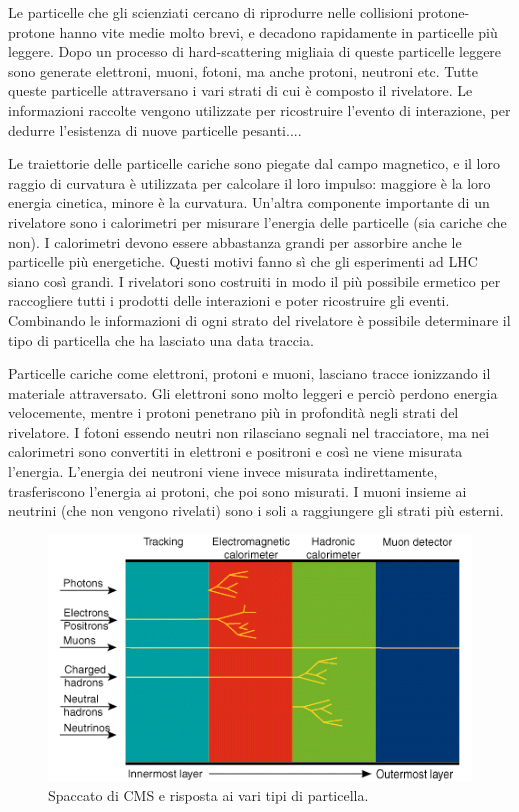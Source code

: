 Le particelle che gli scienziati cercano di riprodurre nelle collisioni protone-protone hanno vite medie molto brevi, e decadono rapidamente in particelle più leggere. Dopo un processo di hard-scattering migliaia di queste particelle leggere sono generate elettroni, muoni, fotoni, ma anche protoni, neutroni etc. Tutte queste particelle attraversano i vari strati di cui è composto il rivelatore. 
Le informazioni raccolte vengono utilizzate per ricostruire l'evento di interazione, per  dedurre l'esistenza di nuove particelle pesanti....


Le traiettorie delle particelle cariche sono piegate dal campo magnetico, e il loro raggio di curvatura è utilizzata per calcolare il loro impulso: maggiore è la loro energia cinetica, minore è la curvatura. Un'altra componente importante di un rivelatore sono i calorimetri per misurare l'energia delle particelle (sia cariche che non). 
I calorimetri devono essere abbastanza grandi per assorbire anche le particelle più energetiche. Questi motivi fanno sì che gli esperimenti ad LHC siano così grandi. I rivelatori sono costruiti in modo il più possibile ermetico per raccogliere tutti i prodotti delle interazioni e poter ricostruire gli eventi. 
Combinando le informazioni di ogni strato del rivelatore è possibile determinare il tipo di particella che ha lasciato una data traccia.

Particelle cariche come elettroni, protoni e muoni, lasciano tracce ionizzando il materiale attraversato. Gli elettroni sono molto leggeri e perciò perdono energia velocemente, mentre i protoni penetrano più in profondità negli strati del rivelatore. I fotoni essendo neutri non rilasciano segnali nel tracciatore, ma nei calorimetri sono convertiti in elettroni e positroni e così ne viene misurata l'energia. 
L'energia dei neutroni viene invece misurata indirettamente, trasferiscono l'energia ai protoni, che poi sono misurati. I muoni insieme ai neutrini (che non vengono rivelati) sono i soli a raggiungere gli strati più esterni.


\begin{figure}
\centering
\includegraphics[scale=0.7]{Immagini/CMSinterazione}
\caption{Spaccato di CMS e risposta ai vari tipi di particella.}
\label{CMSinterazione}
\end{figure}

